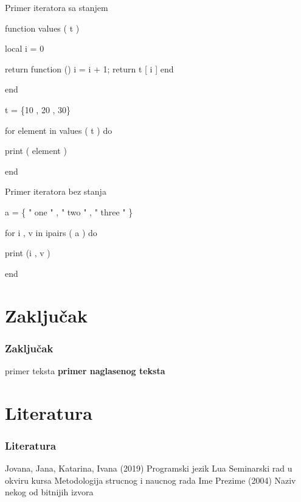 \documentclass{beamer}
\begin{document}
\begin{frame}

\begin{block}{Primer iteratora sa stanjem}
\begin{semiverbatim}
function values ( t )

	\quad local i = 0
	
	\quad return function () i = i + 1; return t [ i ] end
	
end

t = \{10 , 20 , 30\}

for element in values ( t ) do

	\quad print ( element )
	
end
\end{semiverbatim}
\end{block}

\begin{block}{Primer iteratora bez stanja}
\begin{semiverbatim}
a = \{ " one " , " two " , " three " \}

for i , v in ipairs ( a ) do

	\quad print (i , v )

end

\end{semiverbatim}
\end{block}


\end{frame}


\section{Zaključak}

\begin{frame}
\frametitle{Zaključak}

\begin{block}{primer teksta}
\textbf{primer naglasenog teksta}
\end{block}

\end{frame}


\section{Literatura}

\begin{frame}
\frametitle{Literatura}

\footnotesize{
\begin{thebibliography}{99}
 Jovana, Jana, Katarina, Ivana (2019)
\newblock Programski jezik Lua \small{Seminarski rad u okviru kursa Metodologija strucnog i naucnog rada}
 Ime Prezime (2004)
\newblock Naziv nekog od bitnijih izvora
\end{thebibliography}
}
\end{frame}
\end{document}
